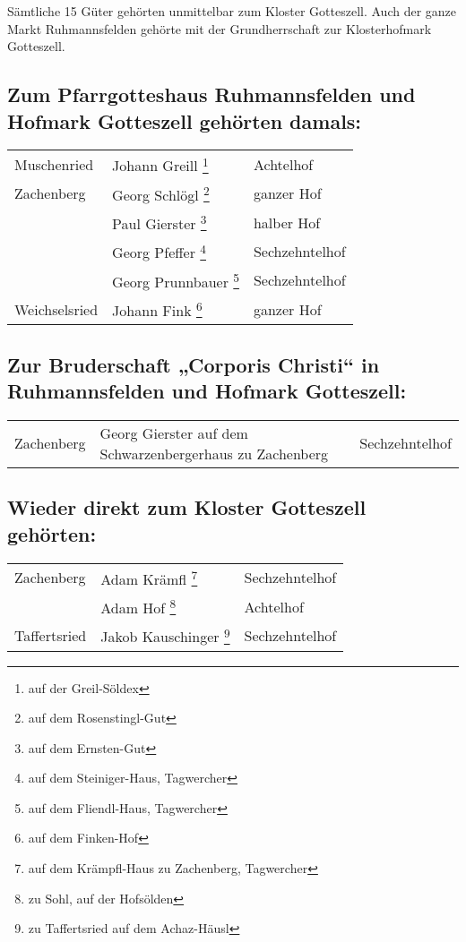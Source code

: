 \documentclass[12pt,a4pager]{book}
\begin{document}
Sämtliche 15 Güter gehörten unmittelbar zum Kloster Gotteszell. Auch der ganze
Markt Ruhmannsfelden gehörte mit der Grundherrschaft zur Klosterhofmark
Gotteszell.

\subsection{Zum Pfarrgotteshaus Ruhmannsfelden und Hofmark Gotteszell gehörten
damals:}

\begin{longtable}{l|l|l}
Muschenried & Johann Greill \footnote{auf der Greil-Söldex} & Achtelhof\\
Zachenberg & Georg Schlögl \footnote{auf dem Rosenstingl-Gut} & ganzer Hof\\
& Paul Gierster \footnote{auf dem Ernsten-Gut} & halber Hof\\
& Georg Pfeffer \footnote{auf dem Steiniger-Haus, Tagwercher} & Sechzehntelhof\\
& Georg Prunnbauer \footnote{auf dem Fliendl-Haus, Tagwercher} & Sechzehntelhof\\
Weichselsried & Johann Fink \footnote{auf dem Finken-Hof} & ganzer Hof\\
\end{longtable}

\subsection{Zur Bruderschaft „Corporis Christi“ in Ruhmannsfelden und Hofmark Gotteszell:}

\begin{longtable}{l|l|l}
Zachenberg & Georg Gierster auf dem Schwarzenbergerhaus zu Zachenberg &
Sechzehntelhof\\
\end{longtable}

\subsection{Wieder direkt zum Kloster Gotteszell gehörten:}

\begin{longtable}{l|l|l}
Zachenberg & Adam Krämfl \footnote{auf dem Krämpfl-Haus zu Zachenberg,
Tagwercher} & Sechzehntelhof\\

& Adam Hof \footnote{zu Sohl, auf der Hofsölden} & Achtelhof\\

Taffertsried & Jakob Kauschinger \footnote{zu Taffertsried auf dem Achaz-Häusl}
& Sechzehntelhof\\
\end{longtable}
\end{document}
